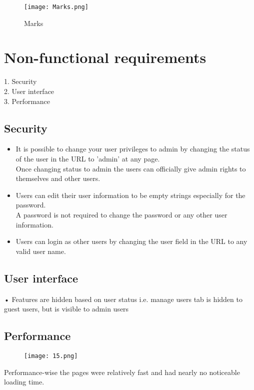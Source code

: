 \documentclass[english]{article}
\begin{document}
\clearpage

\begin{figure}[ht!]
\center
\texttt{[image: Marks.png]}
\caption{Marks}
\end{figure}

\section{Non-functional requirements}
1.	Security\\
2.	User interface\\
3.	Performance\\

\subsection{Security}
\begin{itemize}
     \item It is possible to change your user privileges to admin by changing the status of the user in the URL to 'admin' at any page.\\
     Once changing status to admin the users can officially give admin rights to themselves and other users.
     \item Users can edit their user information to be empty strings especially for the password.\\
     A password is not required to change the password or any other user information.
     \item Users can login as other users by changing the user field in the URL to any valid user name.
   \end{itemize}

\subsection{User interface}
•	Features are hidden based on user status i.e. manage users tab is hidden to guest users, but is visible to admin users\\

\subsection{Performance}
\begin{figure}[ht!]
\texttt{[image: 15.png]}
\end{figure}
Performance-wise the pages were relatively fast and had nearly no noticeable loading time.
\end{document}
